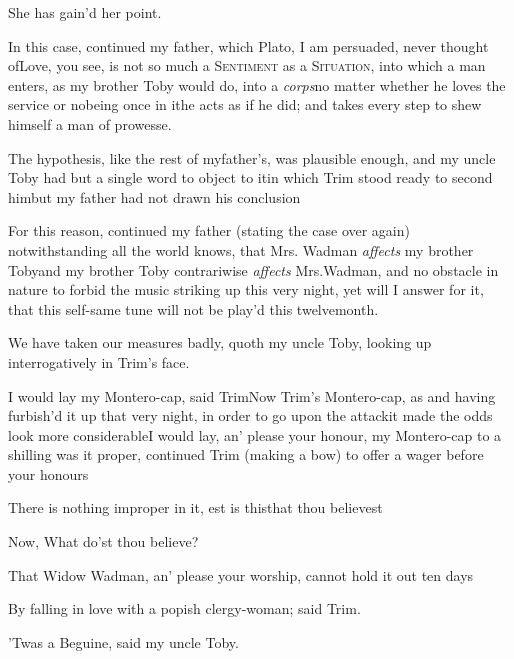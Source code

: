\documentclass[twoside]{article}
\begin{document}
\tsh She has gain’d her point.

In this case, continued my father, which Plato, I am
persuaded, never thought of\tsh Love, you see, is not so
much a \textsc{Sentiment} as a \textsc{Situation}, into
which a man enters, as my brother Toby would do, into a
\textit{corps}\tsh no matter whether he loves the service or
no\tsh being once in it\tsk he acts as if he did; and
takes every step to shew himself a man of prowesse.

The hypothesis, like the rest of my\break father’s, was
plausible enough, and my uncle Toby had but a single word to
object to it\tsk in which Trim stood ready to second
him\tsh but my father had not drawn his
conclusion\tsh

For this reason, continued my father (stating the case over
again) notwithstanding all the world knows, that Mrs.
Wadman \textit{affects} my brother Toby\tsk and my brother
Toby contrariwise \textit{affects} Mrs.\@ Wadman, and no
obstacle in nature to forbid the music striking up this very night,
yet will I answer for it, that this self-same tune will not be
play’d this twelvemonth.

We have taken our measures badly, quoth my uncle Toby,
looking up interrogatively in Trim’s face.

I would lay my Montero-cap, said
Trim\tsh Now Trim’s
Montero-cap, as\break
{}
and having furbish’d it up that very night, in
order to go upon the attack\tsk it made the odds look more
considerable\break\null\tsh I would lay, an’ please your
honour, my Montero-cap to a shilling\tsk {} was it proper,
continued Trim (making a bow) to offer a wager before your
honours\tsh

\tsk There is nothing improper in it,
est is this\tsk that thou believest\tsh

\tsh Now, What do’st thou believe?

That Widow Wadman, an’ please your worship, cannot
hold it out ten days\tsh

\noindent
{}

By falling in love with a popish clergy-woman; said
Trim.

’Twas a Beguine, said my uncle Toby.
\end{document}

